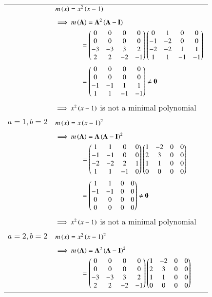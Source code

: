 \documentclass[journal,12pt]{IEEEtran}
\begin{document}
\begin{longtable}{|c|l|}
	&$m\left(x\right)=x^2\left(x-1\right)$\\
	&\\
	& $\implies m\brak{\vec{A}}=\vec{A}^2\brak{\Vec{A}-\vec{I}}$\\
	& $\qquad \qquad=\begin{pmatrix}0&0&0&0\\0&0&0&0\\-3&-3&3&2\\2&2&-2&-1\end{pmatrix}\begin{pmatrix}0&1&0&0\\-1&-2&0&0\\-2&-2&1&1\\1&1&-1&-1\end{pmatrix}$\\
	& $\qquad \qquad = \myvec{0&0&0&0\\0&0&0&0\\-1&-1&1&1\\1&1&-1&-1}\neq\Vec{0}$\\
	&$\implies x^2\left(x-1\right)$ is not a minimal polynomial\\
	\hline
	\multirow{3}{*}{$a=1,b=2$} & \\
	&$m\left(x\right)=x\left(x-1\right)^2$\\
	&\\
	& $\implies m\brak{\vec{A}}=\vec{A}\brak{\Vec{A}-\vec{I}}^2$\\
	& $\qquad\qquad=\begin{pmatrix}1&1&0&0\\-1&-1&0&0\\-2&-2&2&1\\1&1&-1&0\end{pmatrix}\begin{pmatrix}1&-2&0&0\\2&3&0&0\\1&1&0&0\\0&0&0&0\end{pmatrix}$\\
	& $\qquad\qquad = \myvec{1&1&0&0\\-1&-1&0&0\\0&0&0&0\\0&0&0&0}\neq\Vec{0}$\\
	&$\implies x^2\left(x-1\right)$ is not a minimal polynomial\\
	\hline \hline
	\multirow{3}{*}{$a=2,b=2$} & \\
	&$m\left(x\right)=x^2\left(x-1\right)^2$\\
	&\\
	&$\implies m\brak{\vec{A}}=\vec{A}^2\brak{\Vec{A}-\vec{I}}^2$\\
	& $\qquad\qquad=\begin{pmatrix}0&0&0&0\\0&0&0&0\\-3&-3&3&2\\2&2&-2&-1\end{pmatrix}\begin{pmatrix}1&-2&0&0\\2&3&0&0\\1&1&0&0\\0&0&0&0\end{pmatrix}$\\

\end{longtable}
\end{document}
